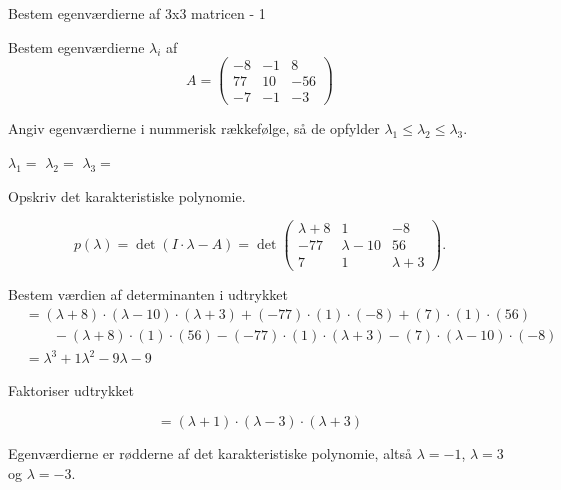 \documentclass{article}
\begin{document}
\tableofcontents
\newpage

\begin{exercise}{Bestem egenværdierne af 3x3 matricen - 1}

Bestem egenværdierne $\lambda_i$ af 
\[
A=\begin{pmatrix}
-8 & -1 & 8 \\
77 & 10 & -56 \\
-7 & -1 & -3
\end{pmatrix}
\]

Angiv egenværdierne i nummerisk rækkefølge, så de
opfylder $\lambda_1 \le \lambda_2 \le \lambda_3$.

$\lambda_1 = $
$\lambda_2 = $
$\lambda_3 = $

\hint
Opskriv det karakteristiske polynomie.

\hint
\[
p(\lambda)=\det\left(I \cdot \lambda - A \right)=\det\begin{pmatrix}
\lambda + 8  & 1 & -8 \\
-77 & \lambda - 10 & 56 \\
7 & 1 & \lambda + 3
\end{pmatrix}.
\]

\hint
Bestem værdien af determinanten i udtrykket
\begin{align*}
&=(\lambda+8) \cdot (\lambda-10) \cdot (\lambda+3)+(-77) \cdot (1) \cdot (-8)+(7) \cdot (1) \cdot (56) \\
& \qquad -(\lambda+8) \cdot (1) \cdot (56)-(-77) \cdot (1) \cdot (\lambda+3)-(7) \cdot (\lambda-10) \cdot (-8) \\
&=\lambda^3+1\lambda^2-9\lambda-9
\end{align*}

\hint
Faktoriser udtrykket

\hint
\[
=(\lambda+1) \cdot (\lambda-3) \cdot (\lambda+3)
\]

\hint
Egenværdierne er rødderne af det karakteristiske polynomie, 
altså
$\lambda=-1$, $\lambda=3$ og $\lambda=-3$.

\end{exercise}
\end{document}
